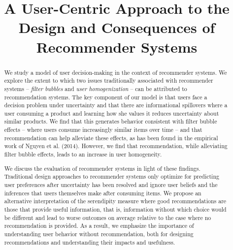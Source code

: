 \documentclass[sigconf]{acmart}
\begin{document}
\setlength{\abovedisplayskip}{0pt}
\setlength{\belowdisplayskip}{0pt}

%
\title{A User-Centric Approach to the Design and Consequences of Recommender Systems}
%

\makeatletter
\def\-copyrightspace{\relax}
\makeatother

%
\begin{abstract}
We study a model of user decision-making in the context of recommender systems. We explore the extent to which two issues traditionally associated with recommender systems -- \textit{filter bubbles} and \textit{user homogenization} -- can be attributed to recommendation systems. The key component of our model is that users face a decision problem under uncertainty and that there are informational spillovers where a user consuming a product and learning how she values it reduces uncertainty about similar products. We find that this generates behavior consistent with filter bubble effects -- where users consume increasingly similar items over time -- and that recommendation can help alleviate these effects, as has been found in the empirical work of Nguyen et al. (2014). However, we find that recommendation, while alleviating filter bubble effects, leads to an increase in user homogeneity.
\par
We discuss the evaluation of recommender systems in light of these findings. Traditional design approaches to recommender systems only optimize for predicting user preferences after uncertainty has been resolved and ignore user beliefs and the inferences that users themselves make after consuming items. We propose an alternative interpretation of the serendipity measure where good recommendations are those that provide useful information, that is, information without which choice would be different and lead to worse outcomes on average relative to the case where no recommendation is provided. As a result, we emphasize the importance of understanding user behavior without recommendation, both for designing recommendations and understanding their impacts and usefulness.
\end{abstract}
\end{document}
